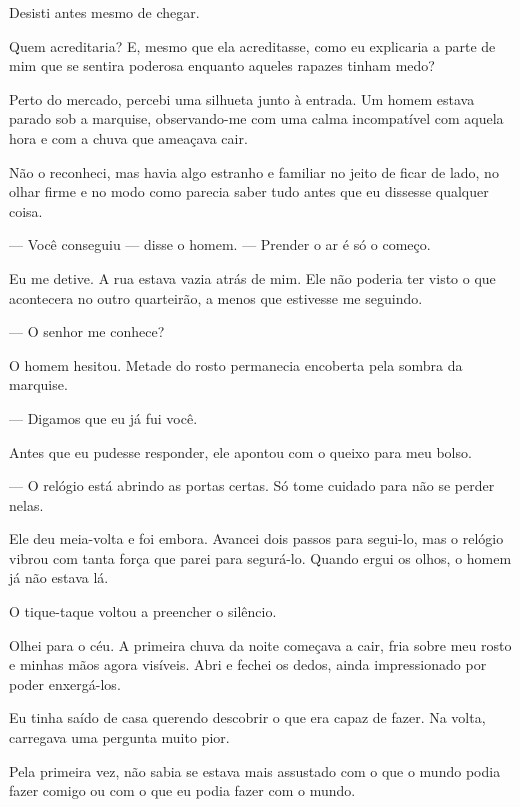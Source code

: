 Desisti antes mesmo de chegar.

Quem acreditaria? E, mesmo que ela acreditasse, como eu explicaria a parte de mim que se sentira poderosa enquanto aqueles rapazes tinham medo?

Perto do mercado, percebi uma silhueta junto à entrada. Um homem estava parado sob a marquise, observando-me com uma calma incompatível com aquela hora e com a chuva que ameaçava cair.

Não o reconheci, mas havia algo estranho e familiar no jeito de ficar de lado, no olhar firme e no modo como parecia saber tudo antes que eu dissesse qualquer coisa.

— Você conseguiu — disse o homem. — Prender o ar é só o começo.

Eu me detive. A rua estava vazia atrás de mim. Ele não poderia ter visto o que acontecera no outro quarteirão, a menos que estivesse me seguindo.

— O senhor me conhece?

O homem hesitou. Metade do rosto permanecia encoberta pela sombra da marquise.

— Digamos que eu já fui você.

Antes que eu pudesse responder, ele apontou com o queixo para meu bolso.

— O relógio está abrindo as portas certas. Só tome cuidado para não se perder nelas.

Ele deu meia-volta e foi embora. Avancei dois passos para segui-lo, mas o relógio vibrou com tanta força que parei para segurá-lo. Quando ergui os olhos, o homem já não estava lá.

\medskip

O tique-taque voltou a preencher o silêncio.

Olhei para o céu. A primeira chuva da noite começava a cair, fria sobre meu rosto e minhas mãos agora visíveis. Abri e fechei os dedos, ainda impressionado por poder enxergá-los.

Eu tinha saído de casa querendo descobrir o que era capaz de fazer. Na volta, carregava uma pergunta muito pior.

Pela primeira vez, não sabia se estava mais assustado com o que o mundo podia fazer comigo ou com o que eu podia fazer com o mundo.
